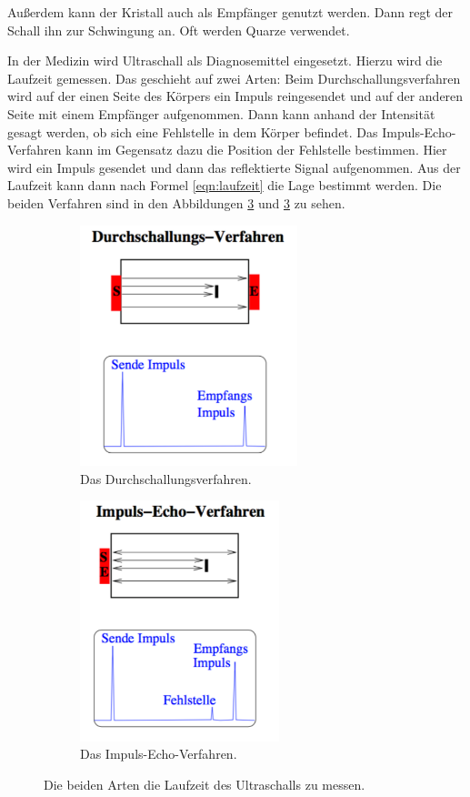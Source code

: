 Außerdem kann der Kristall auch als Empfänger genutzt werden. Dann regt der Schall ihn zur Schwingung an.
Oft werden Quarze verwendet.

In der Medizin wird Ultraschall als Diagnosemittel eingesetzt. Hierzu wird die Laufzeit gemessen.
Das geschieht auf zwei Arten:
Beim Durchschallungsverfahren wird auf der einen Seite des Körpers ein Impuls reingesendet
und auf der anderen Seite mit einem Empfänger aufgenommen. Dann kann anhand der Intensität
gesagt werden, ob sich eine Fehlstelle in dem Körper befindet.
Das Impuls-Echo-Verfahren kann im Gegensatz dazu die Position der Fehlstelle bestimmen.
Hier wird ein Impuls gesendet und dann das reflektierte Signal aufgenommen. Aus
der Laufzeit kann dann nach Formel \eqref{eqn:laufzeit} die Lage bestimmt werden.
Die beiden Verfahren sind in den Abbildungen \ref{fig:verfahren}
und \ref{fig:verfahren} zu sehen.

\begin{figure}
  \centering
  \begin{subfigure}{0.48\textwidth}
    \centering
    \includegraphics[height=7cm]{Pics/durchschall.pdf}
    \caption{Das Durchschallungsverfahren.\cite{anleitung}}
    \label{fig:durchschall}
  \end{subfigure}
  \begin{subfigure}{0.48\textwidth}
    \centering
    \includegraphics[height=7cm]{Pics/Impuls-Echo.pdf}
    \caption{Das Impuls-Echo-Verfahren.\cite{anleitung}}
    \label{fig:impuls_echo}
  \end{subfigure}
  \caption{Die beiden Arten die Laufzeit des Ultraschalls zu messen.}
  \label{fig:verfahren}
\end{figure}

